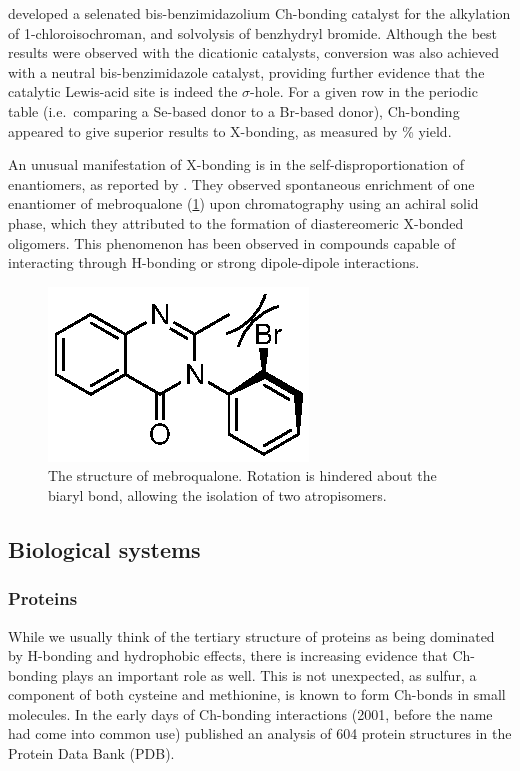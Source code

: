 \begin{refsection}
\citeauthor{Wonner2017} developed a selenated bis-benzimidazolium Ch-bonding catalyst for the alkylation of 1-chloroisochroman, and solvolysis of benzhydryl bromide.\autocite{Wonner2017,Wonner2017a}
Although the best results were observed with the dicationic catalysts, conversion was also achieved with a neutral bis-benzimidazole catalyst, providing further evidence that the catalytic Lewis-acid site is indeed the $ \sigma $-hole.
For a given row in the periodic table (i.e.\ comparing a Se-based donor to a Br-based donor), Ch-bonding appeared to give superior results to X-bonding, as measured by \% yield.

An unusual manifestation of X-bonding is in the self-disproportionation of enantiomers, as reported by \citeauthor{Soloshonok2017}.\autocite{Soloshonok2017}
They observed spontaneous enrichment of one enantiomer of mebroqualone (\cref{fig:mebroqualone}) upon chromatography using an achiral solid phase, which they attributed to the formation of diastereomeric X-bonded oligomers.
This phenomenon has been observed in compounds capable of interacting through H-bonding or strong dipole-dipole interactions.\autocite{Cundy1983}

\begin{figure}
    \centering
    \includegraphics[scale=0.8]{Figures/mebroqualone.eps}
    \caption[The structure of mebroqualone.]{The structure of mebroqualone. Rotation is hindered about the biaryl bond, allowing the isolation of two atropisomers.}\label{fig:mebroqualone}
\end{figure}

\subsection{Biological systems}

\subsubsection{Proteins}
While we usually think of the tertiary structure of proteins as being dominated by H-bonding and hydrophobic effects, there is increasing evidence that Ch-bonding plays an important role as well.
This is not unexpected, as sulfur, a component of both cysteine and methionine, is known to form Ch-bonds in small molecules.
In the early days of Ch-bonding interactions (2001, before the name had come into common use) \citeauthor{Iwaoka2001} published an analysis of 604 protein structures in the Protein Data Bank (PDB).\autocite{Iwaoka2001}


\end{refsection}
